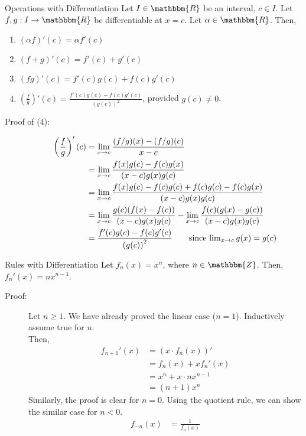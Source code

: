 \documentclass[10pt]{extarticle}
\newcommand{\Z}{\mathbbm{Z}}
\newcommand{\R}{\mathbbm{R}}
\begin{document}
  \begin{problem}{Operations with Differentiation}
    Let $I\in\R$ be an interval, $c\in I$. Let $f,g: I\rightarrow \R$ be differentiable at $x=c$. Let $\alpha\in\R$. Then,
    \begin{enumerate}[(1)]
      \item $\displaystyle(\alpha f)'(c) = \alpha f'(c)$
      \item $\displaystyle(f+g)'(c) = f'(c) + g'(c)$
      \item $\displaystyle(fg)'(c) = f'(c)g(c) + f(c)g'(c)$
      \item $\displaystyle\left(\frac{f}{g}\right)'(c) = \frac{f'(c)g(c)-f(c)g'(c)}{\left(g(c)\right)^2}$, provided $g(c) \neq 0$.
    \end{enumerate}
    \tcblower
    \begin{description}
      \item[Proof of (4):]
        \begin{align*}
          \left(\frac{f}{g}\right)'(c) &=\lim_{x\rightarrow c} \frac{(f/g)(x) - (f/g)(c)}{x-c}\\
                                       &= \lim_{x\rightarrow c} \frac{f(x)g(c) - f(c)g(x)}{(x-c)g(x)g(c)}\\
                                       &= \lim_{x\rightarrow c}\frac{f(x)g(c)-f(c)g(c) + f(c)g(c) - f(c)g(x)}{(x-c)g(x)g(c)}\\
                                       &= \lim_{x\rightarrow c}\frac{g(c)(f(x) - f(c))}{(x-c)g(x)g(c)} - \lim_{x\rightarrow c}\frac{f(c)(g(x) - g(c))}{(x-c)g(x)g(c)}\\
                                       &= \frac{f'(c)g(c) - f(c)g'(c)}{\left(g(c)\right)^2} \tag*{since $\lim_{x\rightarrow c}g(x) = g(c)$}
        \end{align*}
    \end{description}
  \end{problem}
  \begin{problem}{Rules with Differentiation}
    Let $f_n(x) = x^n$, where $n\in \Z$. Then, $f_n'(x) = nx^{n-1}$.
    \begin{description}
      \item[Proof:] Let $n\geq 1$. We have already proved the linear case ($n=1$). Inductively assume true for $n$.\\

        Then, 
        \begin{align*}
          f_{n+1}'(x) &= (x \cdot f_n(x))'\\
                      &= f_n(x) + xf_n'(x)\\
                      &= x^n + x \cdot nx^{n-1}\\
                      &= (n+1)x^{n}
        \end{align*}
        Similarly, the proof is clear for $n=0$. Using the quotient rule, we can show the similar case for $n < 0$.
        \begin{align*}
          f_{-n}(x) &= \frac{1}{f_n(x)} \tag*{$n = 1,2,3,\dots$}
        \end{align*}
    \end{description}
  \end{problem}
\end{document}
